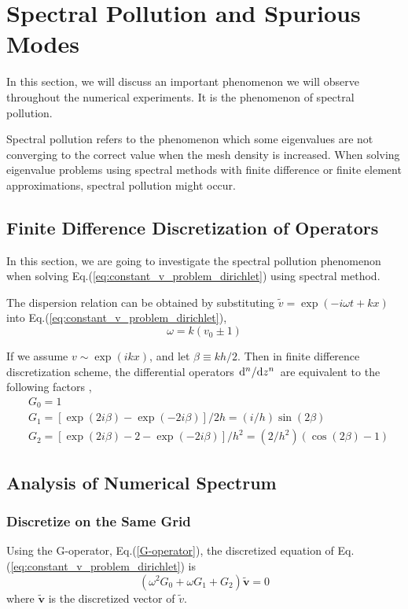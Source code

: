 \section{Spectral Pollution and Spurious Modes}
In this section, we will discuss an important phenomenon we will observe throughout the numerical experiments. It is the phenomenon of spectral pollution.

Spectral pollution refers to the phenomenon which some eigenvalues are not converging to the correct value when the mesh density is increased. When solving eigenvalue problems using spectral methods with finite difference or finite element approximations, spectral pollution might occur. \cite{llobet_spectral_1990}

\subsection{Finite Difference Discretization of Operators}
In this section, we are going to investigate the spectral pollution phenomenon when solving Eq.(\ref{eq:constant_v_problem_dirichlet}) using spectral method.

The dispersion relation can be obtained by substituting $\tilde{v} = \exp(-i\omega t + kx)$ into Eq.(\ref{eq:constant_v_problem_dirichlet}),
\begin{equation} \label{dispersion_relation}
	\omega = k(v_0 \pm 1) 
\end{equation}

If we assume $v\sim \exp(ikx)$, and let $\beta\equiv kh/2$. Then in finite difference discretization scheme, the differential operators $\dv*[n]{z}$ are equivalent to the following factors \cite{llobet_spectral_1990},
\begin{align}
	&G_0 = 1 \nonumber \\
	&G_1 = [\exp(2i\beta)-\exp(-2i\beta)]/2h = (i/h)\sin(2\beta) 
	\label{G-operator}\\
	&G_2 = [\exp(2i\beta)-2-\exp(-2i\beta)]/h^2 = (2/h^2)(\cos(2\beta)-1) \nonumber 
\end{align}


\subsection{Analysis of Numerical Spectrum}
\subsubsection{Discretize on the Same Grid}
Using the G-operator, Eq.(\ref{G-operator}), the discretized equation of Eq.(\ref{eq:constant_v_problem_dirichlet}) is 
\begin{equation} \label{eq:discretized_eq_G}
    (\omega^2G_0 + \omega G_1 + G_2)\mathbf{\tilde{v}} = 0
\end{equation}
where $\mathbf{\tilde{v}}$ is the discretized vector of $\tilde{v}$.

